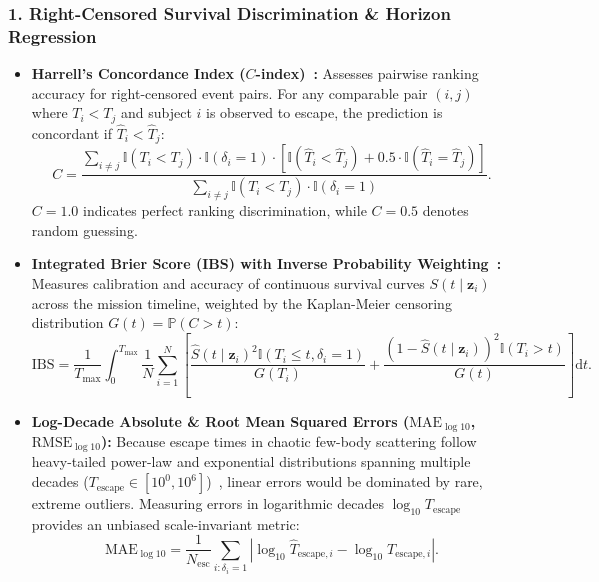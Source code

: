 \documentclass[preprint,12pt,3p]{elsarticle}
\begin{document}
\subsubsection{1. Right-Censored Survival Discrimination \& Horizon Regression}
\begin{itemize}
    \item \textbf{Harrell's Concordance Index ($C$-index)~\cite{harrell1982evaluating}:} Assesses pairwise ranking accuracy for right-censored event pairs. For any comparable pair $(i, j)$ where $T_i < T_j$ and subject $i$ is observed to escape, the prediction is concordant if $\hat{T}_i < \hat{T}_j$:
    \begin{equation}
    C = \frac{\sum_{i \neq j} \mathbb{I}(T_i < T_j) \cdot \mathbb{I}(\delta_i = 1) \cdot \left[ \mathbb{I}(\hat{T}_i < \hat{T}_j) + 0.5 \cdot \mathbb{I}(\hat{T}_i = \hat{T}_j) \right]}{\sum_{i \neq j} \mathbb{I}(T_i < T_j) \cdot \mathbb{I}(\delta_i = 1)}.
    \end{equation}
    $C = 1.0$ indicates perfect ranking discrimination, while $C = 0.5$ denotes random guessing.
    \item \textbf{Integrated Brier Score (IBS) with Inverse Probability Weighting~\cite{graf1999assessment}:} Measures calibration and accuracy of continuous survival curves $S(t \mid \bm{z}_i)$ across the mission timeline, weighted by the Kaplan-Meier censoring distribution $G(t) = \mathbb{P}(C > t)$:
    \begin{equation}
    \mathrm{IBS} = \frac{1}{T_{\max}} \int_0^{T_{\max}} \frac{1}{N} \sum_{i=1}^{N} \left[ \frac{\hat{S}(t \mid \bm{z}_i)^2 \mathbb{I}(T_i \le t, \delta_i = 1)}{G(T_i)} + \frac{(1 - \hat{S}(t \mid \bm{z}_i))^2 \mathbb{I}(T_i > t)}{G(t)} \right] \mathrm{d}t.
    \end{equation}
    \item \textbf{Log-Decade Absolute \& Root Mean Squared Errors ($\mathrm{MAE}_{\log 10}$, $\mathrm{RMSE}_{\log 10}$):} Because escape times in chaotic few-body scattering follow heavy-tailed power-law and exponential distributions spanning multiple decades ($T_{\mathrm{escape}} \in [10^0, 10^6]$)~\cite{stone2019statistical}, linear errors would be dominated by rare, extreme outliers. Measuring errors in logarithmic decades $\log_{10} T_{\mathrm{escape}}$ provides an unbiased scale-invariant metric:
    \begin{equation}
    \mathrm{MAE}_{\log 10} = \frac{1}{N_{\mathrm{esc}}} \sum_{i: \delta_i = 1} \left| \log_{10} \hat{T}_{\mathrm{escape}, i} - \log_{10} T_{\mathrm{escape}, i} \right|.
    \end{equation}
\end{itemize}
\end{document}
